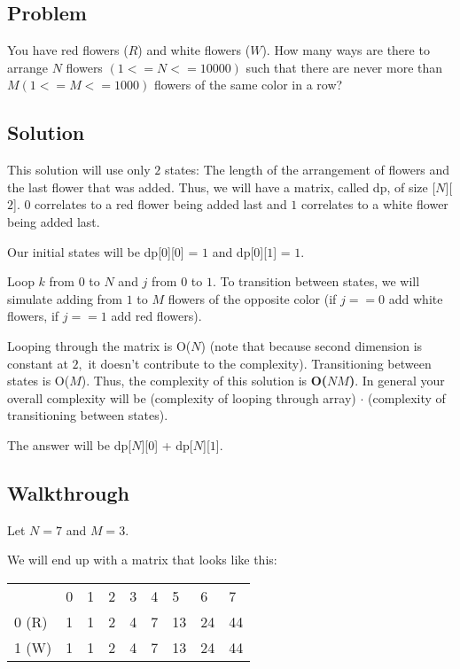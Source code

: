 \documentclass{article}
\begin{document}
\subsection{Problem}
You have red flowers ($R$) and white flowers ($W$). How many ways are there to arrange $N$ flowers $(1 <= N <= 10000)$ such that there are never more than $M (1 <= M <= 1000)$ flowers of the same color in a row?

\subsection{Solution}
This solution will use only $2$ states: The length of the arrangement of flowers and the last flower that was added. Thus, we will have a matrix, called dp, of size [$N$][$2$]. $0$ correlates to a red flower being added last and $1$ correlates to a white flower being added last. 

Our initial states will be dp[$0$][$0$] = $1$ and dp[$0$][$1$] = $1.$

Loop $k$ from $0$ to $N$ and $j$ from $0$ to $1.$ To transition between states, we will simulate adding from $1$ to $M$ flowers of the opposite color (if $j == 0$ add white flowers, if $j == 1$ add red flowers).

Looping through the matrix is O($N$) (note that because second dimension is constant at $2,$ it doesn't contribute to the complexity). Transitioning between states is O($M$). Thus, the complexity of this solution is \textbf{O($NM$)}. In general your overall complexity will be (complexity of looping through array) $\cdot$ (complexity of transitioning between states).

The answer will be dp[$N$][$0$] + dp[$N$][$1$].

\subsection{Walkthrough}

Let $N = 7$ and $M = 3.$

We will end up with a matrix that looks like this:

\begin{table}[h]
\begin{tabular}{lllllllll}
                           & 0                      & 1                      & 2                      & 3                      & 4                      & 5                       & 6                       & 7                       \\ \cline{2-9} 
\multicolumn{1}{l|}{0 (R)} & \multicolumn{1}{l|}{1} & \multicolumn{1}{l|}{1} & \multicolumn{1}{l|}{2} & \multicolumn{1}{l|}{4} & \multicolumn{1}{l|}{7} & \multicolumn{1}{l|}{13} & \multicolumn{1}{l|}{24} & \multicolumn{1}{l|}{44} \\ \cline{2-9} 
\multicolumn{1}{l|}{1 (W)} & \multicolumn{1}{l|}{1} & \multicolumn{1}{l|}{1} & \multicolumn{1}{l|}{2} & \multicolumn{1}{l|}{4} & \multicolumn{1}{l|}{7} & \multicolumn{1}{l|}{13} & \multicolumn{1}{l|}{24} & \multicolumn{1}{l|}{44} \\ \cline{2-9} 
\end{tabular}
\end{table}
\end{document}
